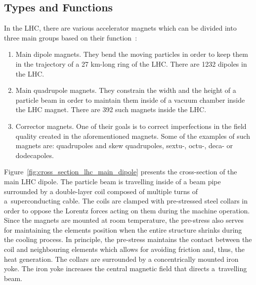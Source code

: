 
\subsection{Types and Functions}

In the LHC, there are various accelerator magnets which can be divided into three main groups based on their function~\cite{cern_main_webpage}: 
\begin{enumerate}
    \item Main dipole magnets. They bend the moving particles in order to keep them in the trajectory of a 27 km-long ring of the LHC. There are 1232 dipoles in the LHC.
    \item Main quadrupole magnets. They constrain the width and the height of a particle beam in order to maintain them inside of a vacuum chamber inside the LHC magnet. There are 392 such magnets inside the LHC.
    \item Corrector magnets. One of their goals is to correct imperfections in the field quality created in the aforementioned magnets. Some of the examples of such magnets are: quadrupoles and skew quadrupoles, sextu-, octu-, deca- or dodecapoles. 
\end{enumerate}

Figure~\ref{fig:cross_section_lhc_main_dipole} presents the cross-section of the main LHC dipole. The particle beam is travelling inside of a beam pipe surrounded by a double-layer coil composed of multiple turns of a~superconducting cable. The coils are clamped with pre-stressed steel collars in order to oppose the Lorentz forces acting on them during the machine operation. Since the magnets are mounted at room temperature, the pre-stress also serves for maintaining the elements position when the entire structure shrinks during the cooling process. In principle, the pre-stress maintains the contact between the coil and neighbouring elements which allows for avoiding friction and, thus, the heat generation. The collars are surrounded by a concentrically mounted iron yoke. The iron yoke increases the central magnetic field that directs a~travelling beam.

